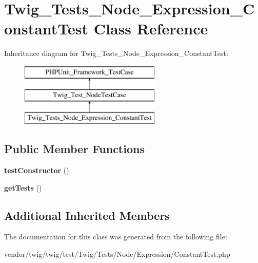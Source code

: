 \hypertarget{classTwig__Tests__Node__Expression__ConstantTest}{}\section{Twig\+\_\+\+Tests\+\_\+\+Node\+\_\+\+Expression\+\_\+\+Constant\+Test Class Reference}
\label{classTwig__Tests__Node__Expression__ConstantTest}
Inheritance diagram for Twig\+\_\+\+Tests\+\_\+\+Node\+\_\+\+Expression\+\_\+\+Constant\+Test\+:\begin{figure}[H]
\begin{center}
\leavevmode
\includegraphics[height=3.000000cm]{classTwig__Tests__Node__Expression__ConstantTest}
\end{center}
\end{figure}
\subsection*{Public Member Functions}
\begin{DoxyCompactItemize}
\item 
{\bfseries test\+Constructor} ()\hypertarget{classTwig__Tests__Node__Expression__ConstantTest_a0a3e31c1103b34ac902c0036378f566b}{}\label{classTwig__Tests__Node__Expression__ConstantTest_a0a3e31c1103b34ac902c0036378f566b}

\item 
{\bfseries get\+Tests} ()\hypertarget{classTwig__Tests__Node__Expression__ConstantTest_a21399e7055aa9e7284040a1553e5a568}{}\label{classTwig__Tests__Node__Expression__ConstantTest_a21399e7055aa9e7284040a1553e5a568}

\end{DoxyCompactItemize}
\subsection*{Additional Inherited Members}


The documentation for this class was generated from the following file\+:\begin{DoxyCompactItemize}
\item 
vendor/twig/twig/test/\+Twig/\+Tests/\+Node/\+Expression/Constant\+Test.\+php\end{DoxyCompactItemize}
